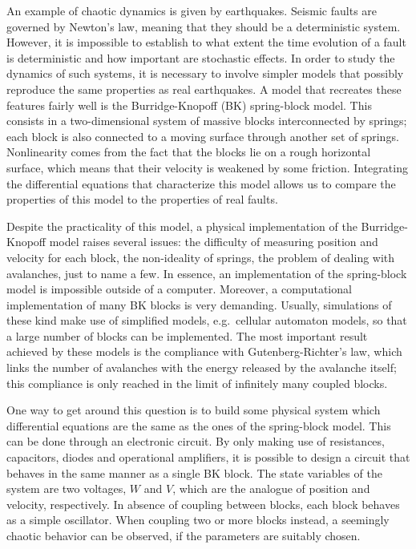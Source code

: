 An example of chaotic dynamics is given by earthquakes. Seismic faults are governed by Newton's law,
meaning that they should be a deterministic system. However, it is impossible to establish to what
extent the time evolution of a fault is deterministic and how important are stochastic effects.
In order to study the dynamics of such systems, it is necessary to involve simpler models that
possibly reproduce the same properties as real earthquakes. A model that recreates these
features fairly well is the Burridge-Knopoff (BK) spring-block model. This consists in a two-dimensional
system of massive blocks interconnected by springs; each block is also connected to a moving surface
through another set of springs. Nonlinearity comes from the fact that the blocks lie on a rough
horizontal surface, which means that their velocity is weakened by some friction. Integrating the
differential equations that characterize this model allows us to compare the properties of this model
to the properties of real faults.

Despite the practicality of this model, a physical implementation of the Burridge-Knopoff model raises
several issues: the difficulty of measuring position and velocity for each block, the non-ideality
of springs, the problem of dealing with avalanches, just to name a few. In essence, an implementation
of the spring-block model is impossible outside of a computer. Moreover, a computational implementation
of many BK blocks is very demanding. Usually, simulations of these kind make use of simplified models,
e.g.\ cellular automaton models, so that a large number of blocks can be implemented.
The most important result achieved by these models is the compliance with Gutenberg-Richter's law, which
links the number of avalanches with the energy released by the avalanche itself; this compliance is only
reached in the limit of infinitely many coupled blocks.

One way to get around this question is to build some physical system which differential equations
are the same as the ones of the spring-block model. This can be done through an electronic circuit. By only
making use of resistances, capacitors, diodes and operational amplifiers, it is possible to design
a circuit that behaves in the same manner as a single BK block. The state variables
of the system are two voltages, $W$ and $V$, which are the analogue of position and velocity, respectively.
In absence of coupling between blocks, each block behaves as a simple oscillator. When coupling two or
more blocks instead, a seemingly chaotic behavior can be observed, if the parameters are suitably
chosen.

